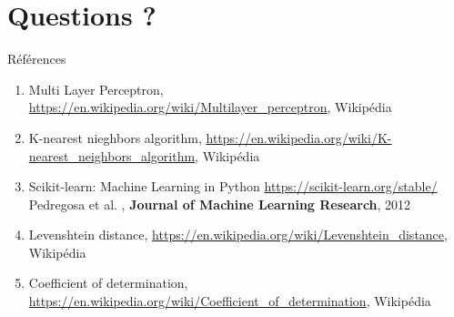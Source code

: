 \documentclass{beamer}
\begin{document}
\appendix

{\section*{Questions ?}}

\begin{frame}{Références}
    \begin{enumerate}
        \item Multi Layer Perceptron, \url{https://en.wikipedia.org/wiki/Multilayer_perceptron}, Wikipédia

        \item K-nearest nieghbors algorithm, \url{https://en.wikipedia.org/wiki/K-nearest_neighbors_algorithm}, Wikipédia

        \item Scikit-learn: Machine Learning in Python \url{https://scikit-learn.org/stable/} Pedregosa et al. , \textbf{Journal of Machine Learning Research}, 2012

        \item Levenshtein distance, \url{https://en.wikipedia.org/wiki/Levenshtein_distance}, Wikipédia

        \item Coefficient of determination, \url{https://en.wikipedia.org/wiki/Coefficient_of_determination}, Wikipédia
    \end{enumerate}
\end{frame}
\end{document}
